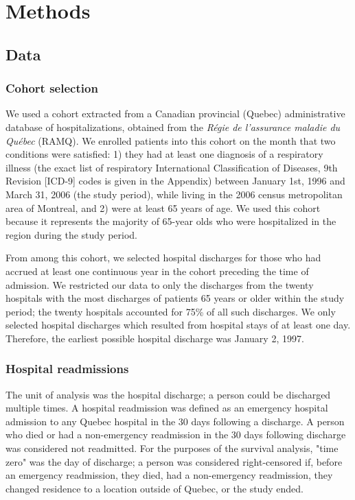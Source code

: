 \documentclass[]{article}\usepackage[]{graphicx}\usepackage[]{color}
\begin{document}
\section{Methods}

\subsection{Data}

\subsubsection{Cohort selection}
We used a cohort extracted from a Canadian provincial (Quebec) administrative database of hospitalizations, obtained from the \emph{Régie de l'assurance maladie du Québec} (RAMQ). We enrolled patients into this cohort on the month that two conditions were satisfied: 1) they had at least one diagnosis of a respiratory illness (the exact list of respiratory International Classification of Diseases, 9th Revision [ICD-9] codes is given in the Appendix) between January 1st, 1996 and March 31, 2006 (the study period), while living in the 2006 census metropolitan area of Montreal, and 2) were at least 65 years of age. We used this cohort because it represents the majority of 65-year olds who were hospitalized in the region during the study period. 

From among this cohort, we selected hospital discharges for those who had accrued at least one continuous year in the cohort preceding the time of admission. We restricted our data to only the discharges from the twenty hospitals with the most discharges of patients 65 years or older within the study period; the twenty hospitals accounted for 75\% of all such discharges.  We only selected hospital discharges which resulted from hospital stays of at least one day. Therefore, the earliest possible hospital discharge was January 2, 1997.

\subsubsection{Hospital readmissions}
The unit of analysis was the hospital discharge; a person could be discharged multiple times. A hospital readmission was defined as an emergency hospital admission to any Quebec hospital in the 30 days following a discharge.  A person who died or had a non-emergency readmission in the 30 days following discharge was considered not readmitted. For the purposes of the survival analysis, "time zero" was the day of discharge; a person was considered right-censored if, before an emergency readmission, they died, had a non-emergency readmission, they changed residence to a location outside of Quebec, or the study ended. 
\end{document}
